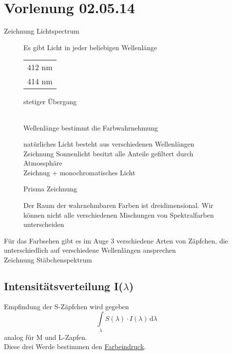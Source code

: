 \documentclass[11pt]{article}
\begin{document}
\section{Vorlenung 02.05.14}
{\color{red}Zeichnung Lichtspectrum}\\
\begin{figure}[!hb]
\begin{minipage}[c]{7.5cm}
Es gibt Licht in jeder beliebigen Wellenlänge \\
\begin{minipage}[c]{2cm}
\begin{tabular}{c}
412 nm \\
414 nm
\end{tabular}
\end{minipage}
\hfill
\begin{minipage}[r]{3cm}
 stetiger Übergang
\end{minipage}\\
Wellenlänge bestimmt die Farbwahrnehmung
\end{minipage}
\hfill
\begin{minipage}[c]{6.5cm}
natürliches Licht besteht aus verschiedenen Wellenlängen\\
{\color{red}Zeichnung  }
Sonnenlicht besitzt alle Anteile gefiltert durch Atmossphäre\\
{\color{red}  Zeichnug + monochromatisches Licht }
\end{minipage}
\end{figure}
\begin{figure}[!hb]
\begin{minipage}[c]{6.5cm}
{\color{red}Prisma Zeichnung}
\end{minipage}
\hfill
\begin{minipage}[c]{7.5cm}
Der Raum der wahrnehmbaren Farben ist dreidimensional. Wir können nicht alle verschiedenen Mischungen von Spektralfarben unterscheiden
\end{minipage}
\end{figure}
Für das Farbsehen gibt es im Auge 3 verschiedene Arten von Zäpfchen, die unterschiedlich auf verschiedene Wellenlängen ansprechen \\
{\color{red}Zeichnung Stäbchenspektrum}
\subsection{Intensitätsverteilung I($\lambda$)}
Empfindung der S-Zäpfchen wird gegeben 
$$ \int\limits_{\lambda}\!S(\lambda) \cdot I(\lambda) \,\mathrm{d}\lambda $$
analog für M und L-Zapfen.\\
Diese drei Werde bestimmen den \underline{Farbeindruck}.
\end{document}
